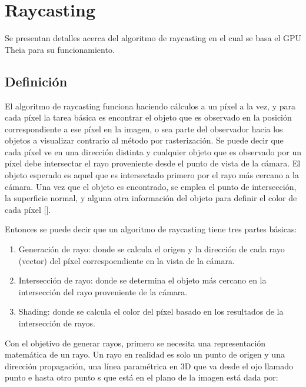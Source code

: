 \section{Raycasting}

Se presentan detalles acerca del algoritmo de raycasting en el cual se basa el GPU Theia para su funcionamiento.

\subsection{Definición}

El algoritmo de raycasting funciona haciendo cálculos a un píxel a la vez, y para cada píxel la tarea básica es encontrar el objeto que es observado en la posición correspondiente a ese píxel en la imagen, o sea parte del observador hacia los objetos a visualizar contrario al método por rasterización. Se puede decir que cada píxel ve en una dirección distinta y cualquier objeto que es observado por un píxel debe intersectar el rayo proveniente desde el punto de vista de la cámara. El objeto esperado es aquel que es intersectado primero por el rayo más cercano a la cámara. Una vez que el objeto es encontrado, se emplea el punto de intersección, la superficie normal, y alguna otra información del objeto para definir el color de cada píxel [\cite{Shirley2009}]. 

Entonces se puede decir que un algoritmo de raycasting tiene tres partes básicas:

\begin{enumerate}

\item Generación de rayo: donde se calcula el origen y la dirección de cada rayo (vector) del píxel correspoendiente en la vista de la cámara.
\item Intersección de rayo: donde se determina el objeto más cercano en la intersección del rayo proveniente de la cámara.
\item Shading: donde se calcula el color del píxel basado en los resultados de la intersección de rayos.

\end{enumerate}

Con el objetivo de generar rayos, primero se necesita una representación matemática de un rayo. Un rayo en realidad es solo un punto de origen y una dirección propagación, una línea paramétrica en 3D que va desde el ojo llamado punto e hasta otro punto s que está en el plano de la imagen está dada por: 

